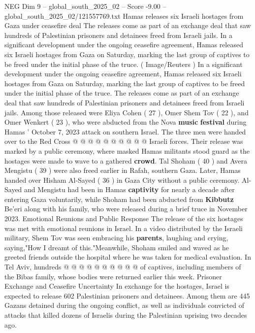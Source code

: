 \begin{textsample}{NEG Dim 9 – global\_south\_2025\_02 – Score -9.00 – global\_south\_2025\_02/121557769.txt}  \label{ex:f9_neg_181}
Hamas releases six Israeli hostages from Gaza under ceasefire deal The releases come as part of an exchange deal that saw hundreds of Palestinian prisoners and detainees freed from Israeli jails.
In a significant development under the ongoing ceasefire agreement, Hamas released six Israeli hostages from Gaza on Saturday, marking the last group of captives to be freed under the initial phase of the truce. ( Image/Reuters ) In a significant development under the ongoing ceasefire agreement, Hamas released six Israeli hostages from Gaza on Saturday, marking the last group of captives to be freed under the initial phase of the truce.
The releases come as part of an exchange deal that saw hundreds of Palestinian prisoners and detainees freed from Israeli jails.
Among those released were Eliya Cohen ( 27 ), Omer Shem Tov ( 22 ), and Omer Wenkert ( 23 ), who were abducted from the Nova \textbf{music} \textbf{festival} during Hamas ' October 7, 2023 attack on southern Israel.
The three men were handed over to the Red Cross @ @ @ @ @ @ @ @ @ @ Israeli forces.
Their release was marked by a public ceremony, where masked Hamas militants stood guard as the hostages were made to wave to a gathered \textbf{crowd}.
Tal Shoham ( 40 ) and Avera Mengistu ( 39 ) were also freed earlier in Rafah, southern Gaza.
Later, Hamas handed over Hisham Al-Sayed ( 36 ) in Gaza City without a public ceremony.
Al-Sayed and Mengistu had been in Hamas \textbf{captivity} for nearly a decade after entering Gaza voluntarily, while Shoham had been abducted from \textbf{Kibbutz} Be'eri along with his family, who were released during a brief truce in November 2023.
Emotional Reunions and Public Response The release of the six hostages was met with emotional reunions in Israel.
In a video distributed by the Israeli military, Shem Tov was seen embracing his \textbf{parents}, laughing and crying, saying,"How I dreamt of this."Meanwhile, Shoham smiled and waved as he greeted friends outside the hospital where he was taken for medical evaluation.
In Tel Aviv, hundreds @ @ @ @ @ @ @ @ @ @ of captives, including members of the Bibas family, whose bodies were returned earlier this week.
Prisoner Exchange and Ceasefire Uncertainty In exchange for the hostages, Israel is expected to release 602 Palestinian prisoners and detainees.
Among them are 445 Gazans detained during the ongoing conflict, as well as individuals convicted of attacks that killed dozens of Israelis during the Palestinian uprising two decades ago.

\end{textsample}

